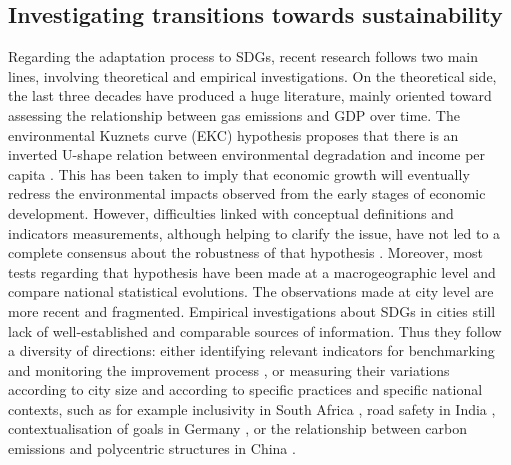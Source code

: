 \documentclass[final,5p,times,twocolumn,authoryear]{elsarticle}
\begin{document}
\subsection{Investigating transitions towards sustainability}

Regarding the adaptation process to SDGs, recent research follows two main lines, involving theoretical and empirical investigations.  On the theoretical side, the last three decades have produced a huge literature, mainly oriented toward assessing the relationship between gas emissions and GDP over time. The environmental Kuznets curve (EKC) hypothesis proposes that there is an inverted U-shape relation between environmental degradation and income per capita \citep{dinda2004environmental, stern2004rise}. This has been taken to imply that economic growth will eventually redress the environmental impacts observed from the early stages of economic development. However, difficulties linked with conceptual definitions and indicators measurements, although helping to clarify the issue, have not led to a complete consensus about the robustness of that hypothesis \citep{harbaugh2002reexamining}. Moreover, most tests regarding that hypothesis have been made at a macrogeographic level and compare national statistical evolutions. The observations made at city level are more recent and fragmented. Empirical investigations about SDGs in cities still lack of well-established and comparable sources of information. Thus they follow a diversity of directions: either identifying relevant indicators for benchmarking and monitoring the improvement process \citep{giles2020achieving}, or measuring their variations according to city size \citep{laituri2021sdg} and according to specific practices and specific national contexts, such as for example inclusivity in South Africa \citep{mudau2020assessment}, road safety in India \citep{mohan2021future}, contextualisation of goals in Germany \citep{koch2018contextualize}, or the relationship between carbon emissions and polycentric structures in China \citep{zhu2022did}. 
\end{document}
